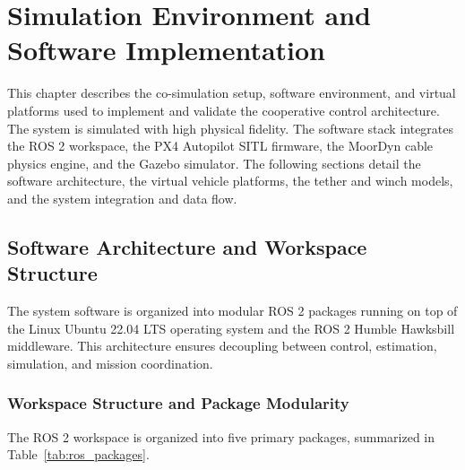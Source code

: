 
\chapter{Simulation Environment and Software Implementation}
\label{chapter:implementation}

This chapter describes the co-simulation setup, software environment, and virtual platforms used to implement and validate the cooperative control architecture. The system is simulated with high physical fidelity. The software stack integrates the ROS 2 workspace, the PX4 Autopilot SITL firmware, the MoorDyn cable physics engine, and the Gazebo simulator. The following sections detail the software architecture, the virtual vehicle platforms, the tether and winch models, and the system integration and data flow.

\section{Software Architecture and Workspace Structure}
\label{sec:sim_ros_architecture}

The system software is organized into modular ROS 2 packages running on top of the Linux Ubuntu 22.04 LTS operating system and the ROS 2 Humble Hawksbill middleware. This architecture ensures decoupling between control, estimation, simulation, and mission coordination.

    \subsection{Workspace Structure and Package Modularity}
    The ROS 2 workspace is organized into five primary packages, summarized in Table~\ref{tab:ros_packages}.

